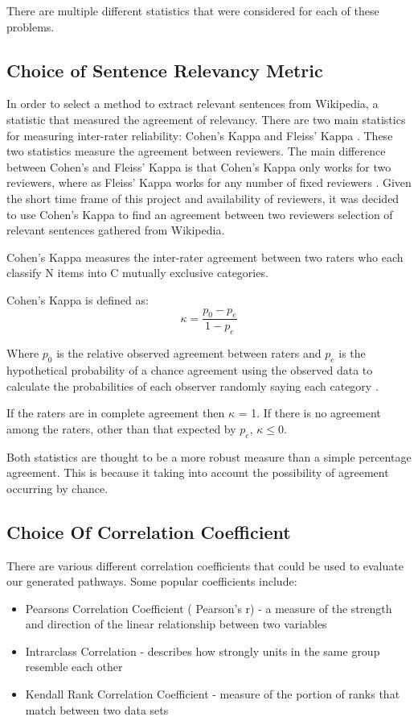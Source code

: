 \documentclass[bsc,frontabs,twoside,singlespacing,parskip,deptreport]{infthesis}     %
\begin{document}
There are multiple different statistics that were considered for each of these problems.
\subsection{Choice of Sentence Relevancy Metric}\label{sec:cohen}
In order to select a method to extract relevant sentences from Wikipedia, a statistic that measured the agreement
of relevancy. There are two main statistics for measuring inter-rater reliability: Cohen's Kappa and Fleiss' Kappa \cite{}.
These two statistics measure the agreement between reviewers. The main difference between Cohen's and Fleiss' Kappa is that
Cohen's Kappa only works for two reviewers, where as Fleiss' Kappa works for any number of fixed reviewers \cite{}.
Given the short time frame of this project and availability of reviewers, it was decided to use Cohen's Kappa
to find an agreement between two reviewers selection of relevant sentences gathered from Wikipedia.

Cohen's Kappa measures the inter-rater agreement between two raters
who each classify N items into C mutually exclusive categories.

Cohen's Kappa is defined as:\\
\begin{equation}
  \kappa = \frac{p_{0} - p_{e}}{1 - p_{e}}\nonumber
\end{equation}

Where $p_0$ is the relative observed agreement between raters and $p_e$ is the hypothetical probability
of a chance agreement using the observed data to calculate the probabilities of each observer randomly saying each category \cite{}.

If the raters are in complete agreement then $\kappa$ = 1.
If there is no agreement among the raters, other than that expected by $p_e$, $\kappa \leq 0$.

Both statistics are thought to be a more robust measure than a simple percentage agreement.
This is because it taking into account the possibility of agreement occurring by chance.

\subsection{Choice Of Correlation Coefficient}\label{sec:kendall}

There are various different correlation coefficients that could be used to evaluate our generated pathways.
Some popular coefficients include:
\begin{itemize}
\item Pearsons Correlation Coefficient ( Pearson's r) - a measure of the strength and direction of the linear relationship between two variables
\item Intrarclass Correlation - describes how strongly units in the same group resemble each other
\item Kendall Rank Correlation Coefficient -  measure of the portion of ranks that match between two data sets
\end{itemize}
\end{document}
